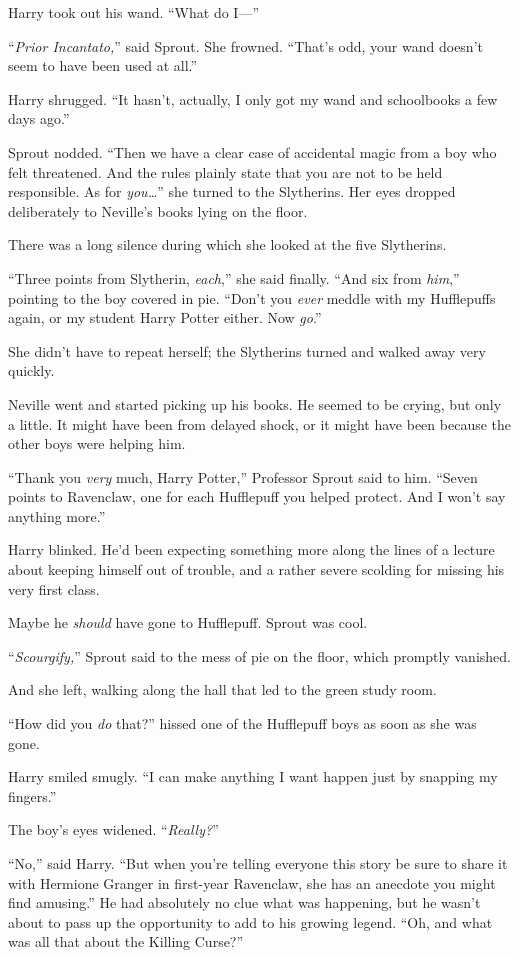 Harry took out his wand. “What do I—”

“\emph{Prior Incantato,}” said Sprout. She frowned. “That’s odd, your wand doesn’t seem to have been used at all.”

Harry shrugged. “It hasn’t, actually, I only got my wand and schoolbooks a few days ago.”

Sprout nodded. “Then we have a clear case of accidental magic from a boy who felt threatened. And the rules plainly state that you are not to be held responsible. As for \emph{you…}” she turned to the Slytherins. Her eyes dropped deliberately to Neville’s books lying on the floor.

There was a long silence during which she looked at the five Slytherins.

“Three points from Slytherin, \emph{each},” she said finally. “And six from \emph{him},” pointing to the boy covered in pie. “Don’t you \emph{ever} meddle with my Hufflepuffs again, or my student Harry Potter either. Now \emph{go}.”

She didn’t have to repeat herself; the Slytherins turned and walked away very quickly.

Neville went and started picking up his books. He seemed to be crying, but only a little. It might have been from delayed shock, or it might have been because the other boys were helping him.

“Thank you \emph{very} much, Harry Potter,” Professor Sprout said to him. “Seven points to Ravenclaw, one for each Hufflepuff you helped protect. And I won’t say anything more.”

Harry blinked. He’d been expecting something more along the lines of a lecture about keeping himself out of trouble, and a rather severe scolding for missing his very first class.

Maybe he \emph{should} have gone to Hufflepuff. Sprout was cool.

“\emph{Scourgify,}” Sprout said to the mess of pie on the floor, which promptly vanished.

And she left, walking along the hall that led to the green study room.

“How did you \emph{do} that?” hissed one of the Hufflepuff boys as soon as she was gone.

Harry smiled smugly. “I can make anything I want happen just by snapping my fingers.”

The boy’s eyes widened. “\emph{Really?}”

“No,” said Harry. “But when you’re telling everyone this story be sure to share it with Hermione Granger in first-year Ravenclaw, she has an anecdote you might find amusing.” He had absolutely no clue what was happening, but he wasn’t about to pass up the opportunity to add to his growing legend. “Oh, and what was all that about the Killing Curse?”

